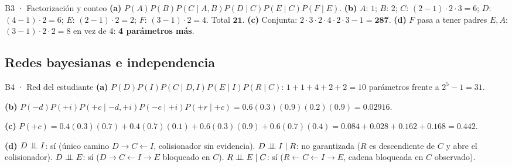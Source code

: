 \begin{solucion}{B3 · Factorización y conteo}
\textbf{(a)} $P(A)P(B)P(C\mid A,B)P(D\mid C)P(E\mid C)P(F\mid E)$.
\textbf{(b)} $A$: $1$; $B$: $2$; $C$: $(2-1)\cdot2\cdot3=6$; $D$: $(4-1)\cdot2=6$; $E$: $(2-1)\cdot2=2$; $F$: $(3-1)\cdot2=4$. Total $\mathbf{21}$.
\textbf{(c)} Conjunta: $2\cdot3\cdot2\cdot4\cdot2\cdot3-1=\mathbf{287}$.
\textbf{(d)} $F$ pasa a tener padres $E,A$: $(3-1)\cdot2\cdot2=8$ en vez de 4: \textbf{4 parámetros más}.
\end{solucion}

\subsection{Redes bayesianas e independencia}

\begin{solucion}{B4 · Red del estudiante}
\textbf{(a)} $P(D)P(I)P(C\mid D,I)P(E\mid I)P(R\mid C)$: $1+1+4+2+2=10$ parámetros frente a $2^5-1=31$.

\textbf{(b)} $P(-d)P(+i)P(+c\mid-d,+i)P(-e\mid+i)P(+r\mid+c)=0.6(0.3)(0.9)(0.2)(0.9)=\mathbf{0.02916}$.

\textbf{(c)} $P(+c)=0.4(0.3)(0.7)+0.4(0.7)(0.1)+0.6(0.3)(0.9)+0.6(0.7)(0.4)=0.084+0.028+0.162+0.168=\mathbf{0.442}$.

\textbf{(d)} $D\perp\!\!\!\perp I$: sí (único camino $D\to C\leftarrow I$, colisionador sin evidencia).
$D\perp\!\!\!\perp I\mid R$: no garantizada ($R$ es descendiente de $C$ y abre el colisionador).
$D\perp\!\!\!\perp E$: sí ($D\to C\leftarrow I\to E$ bloqueado en $C$).
$R\perp\!\!\!\perp E\mid C$: sí ($R\leftarrow C\leftarrow I\to E$, cadena bloqueada en $C$ observado).
\end{solucion}

